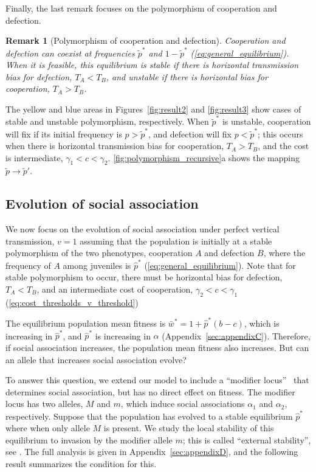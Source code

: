 \documentclass[12pt]{extarticle}
\newtheorem{remark}{Remark}
\begin{document}
Finally, the last remark focuses on the polymorphism of cooperation and defection.
\\

\begin{remark}[Polymorphism of cooperation and defection]
Cooperation and defection can coexist at frequencies $\tilde{p}^*$ and $1-\tilde{p}^*$ (\autoref{eq:general_equilibrium}). 
When it is feasible, this equilibrium is stable if there is horizontal transmission bias for defection, $T_A<T_B$, and unstable if there is horizontal bias for cooperation, $T_A>T_B$.
\end{remark}

The yellow and blue areas in Figures~\ref{fig:result2} and \ref{fig:result3} show cases of stable and unstable polymorphism, respectively.
When $\tilde{p}^*$ is unstable, cooperation will fix if its initial frequency is $p>\tilde{p}^*$, and defection will fix $p<\tilde{p}^*$; this occurs when there is horizontal transmission bias for cooperation, $T_A>T_B$, and the cost is intermediate, $\gamma_1 < c < \gamma_2$.
\autoref{fig:polymorphism_recursive}a shows the mapping $\tilde p \to \tilde p'$.


\subsection*{Evolution of social association} 

We now focus on the evolution of social association under perfect vertical transmission, $v=1$ assuming that the population is initially at a stable polymorphism of the two phenotypes, cooperation $A$ and defection $B$, where the frequency of $A$ among juveniles is $\hat{p}^*$ (\autoref{eq:general_equilibrium}).
Note that for stable polymorphism to occur, there must be horizontal bias for defection, $T_A < T_B$, and an intermediate cost of cooperation, $\gamma_2 < c < \gamma_1$ (\autoref{eq:cost_thresholds_v_threshold})

The equilibrium population mean fitness is $\bar{w}^* = 1 + \hat{p}^*(b-c)$, which is increasing in $\hat{p}^*$, and $\hat{p}^*$ is increasing in $\alpha$ (Appendix~\ref{sec:appendixC}).
Therefore, if social association increases, the population mean fitness also increases.
But can an allele that increases social association evolve? 

To answer this question, we extend our model to include a ``modifier locus''~\citep{Liberman1986,Liberman1988} that determines social association, but has no direct effect on fitness.
The modifier locus has two alleles, $M$ and $m$, which induce social associations $\alpha_1$ and $\alpha_2$, respectively.
Suppose that the population has evolved to a stable equilibrium $\hat{p}^*$ where when only allele $M$ is present.
We study the local stability of this equilibrium to invasion by the modifier allele $m$; this is called ``external stability'', see \citet{Altenberg2017}.
The full analysis is given in Appendix~\ref{sec:appendixD}, and the following result summarizes the condition for this.
\\
\end{document}
